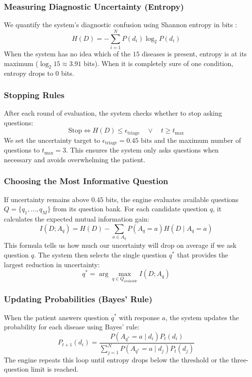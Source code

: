 \documentclass[10pt,twocolumn]{article}
\begin{document}
\subsubsection{Measuring Diagnostic Uncertainty (Entropy)}
We quantify the system's diagnostic confusion using Shannon entropy in bits \cite{shannon1948mathematical}:
\begin{equation}
H(D) = -\sum_{i=1}^N P(d_i) \log_2 P(d_i)
\end{equation}
When the system has no idea which of the $15$ diseases is present, entropy is at its maximum ($\log_2 15 \approx 3.91$ bits). When it is completely sure of one condition, entropy drops to $0$ bits.

\subsubsection{Stopping Rules}
After each round of evaluation, the system checks whether to stop asking questions:
\begin{equation}
\text{Stop} \iff H(D) \le \epsilon_{\text{triage}} \quad \lor \quad t \ge t_{\max}
\end{equation}
We set the uncertainty target to $\epsilon_{\text{triage}} = 0.45\text{ bits}$ and the maximum number of questions to $t_{\max} = 3$. This ensures the system only asks questions when necessary and avoids overwhelming the patient.

\subsubsection{Choosing the Most Informative Question}
If uncertainty remains above $0.45$ bits, the engine evaluates available questions $Q = \{q_1, \dots, q_M\}$ from its question bank. For each candidate question $q$, it calculates the expected mutual information gain:
\begin{equation}
I(D; A_q) = H(D) - \sum_{a \in A_q} P(A_q = a) H(D \mid A_q = a)
\end{equation}
This formula tells us how much our uncertainty will drop on average if we ask question $q$. The system then selects the single question $q^*$ that provides the largest reduction in uncertainty:
\begin{equation}
q^* = \arg\max_{q \in Q_{\text{available}}} I(D; A_q)
\end{equation}

\subsubsection{Updating Probabilities (Bayes' Rule)}
When the patient answers question $q^*$ with response $a$, the system updates the probability for each disease using Bayes' rule:
\begin{equation}
P_{t+1}(d_i) = \frac{P(A_{q^*} = a \mid d_i) P_t(d_i)}{\sum_{j=1}^N P(A_{q^*} = a \mid d_j) P_t(d_j)}
\end{equation}
The engine repeats this loop until entropy drops below the threshold or the three-question limit is reached.
\end{document}
